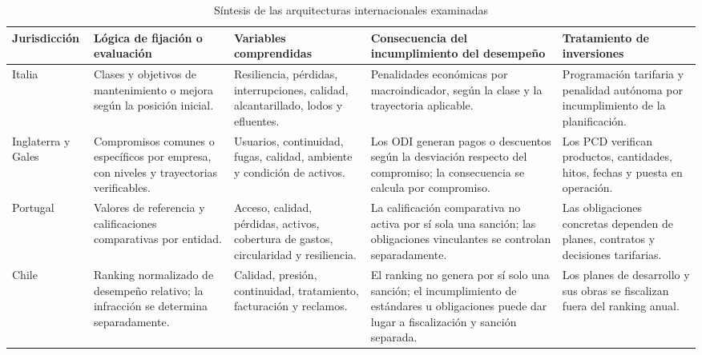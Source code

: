 \begin{table}[!t]
\centering
\caption{Síntesis de las arquitecturas internacionales examinadas}
\label{tab:anexo_experiencia_internacional}
\scriptsize
\renewcommand{\arraystretch}{1.16}
\setlength{\tabcolsep}{3.5pt}
\begin{tabularx}{\textwidth}{
>{\raggedright\arraybackslash}p{1.68cm}
>{\raggedright\arraybackslash}p{2.47cm}
>{\raggedright\arraybackslash}X
>{\raggedright\arraybackslash}p{3.20cm}
>{\raggedright\arraybackslash}p{2.85cm}}
\hline
\textbf{Jurisdicción} &
\textbf{Lógica de fijación o evaluación} &
\textbf{Variables comprendidas} &
\textbf{Consecuencia del incumplimiento del desempeño} &
\textbf{Tratamiento de inversiones} \\
\hline

Italia
&
Clases y objetivos de mantenimiento o mejora según la posición inicial.
&
Resiliencia, pérdidas, interrupciones, calidad, alcantarillado, lodos y efluentes.
&
Penalidades económicas por macroindicador, según la clase y la trayectoria aplicable.
&
Programación tarifaria y penalidad autónoma por incumplimiento de la planificación.
\\

Inglaterra y Gales
&
Compromisos comunes o específicos por empresa, con niveles y trayectorias verificables.
&
Usuarios, continuidad, fugas, calidad, ambiente y condición de activos.
&
Los ODI generan pagos o descuentos según la desviación respecto del compromiso; la consecuencia se calcula por compromiso.
&
Los PCD verifican productos, cantidades, hitos, fechas y puesta en operación.
\\

Portugal
&
Valores de referencia y calificaciones comparativas por entidad.
&
Acceso, calidad, pérdidas, activos, cobertura de gastos, circularidad y resiliencia.
&
La calificación comparativa no activa por sí sola una sanción; las obligaciones vinculantes se controlan separadamente.
&
Las obligaciones concretas dependen de planes, contratos y decisiones tarifarias.
\\

Chile
&
Ranking normalizado de desempeño relativo; la infracción se determina separadamente.
&
Calidad, presión, continuidad, tratamiento, facturación y reclamos.
&
El ranking no genera por sí solo una sanción; el incumplimiento de estándares u obligaciones puede dar lugar a fiscalización y sanción separada.
&
Los planes de desarrollo y sus obras se fiscalizan fuera del ranking anual.
\\


\end{tabularx}
\end{table}
